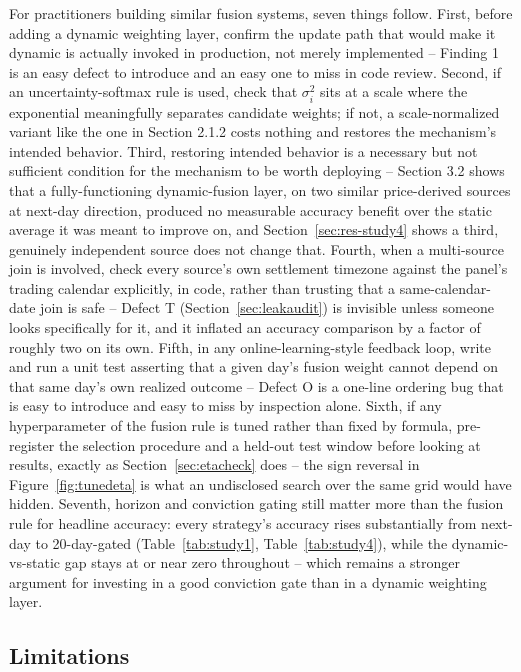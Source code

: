 \documentclass[10pt,a4paper,twocolumn]{article}
\begin{document}
For practitioners building similar fusion systems, seven things follow. First, before adding a dynamic weighting layer, confirm the update path that would make it dynamic is actually invoked in production, not merely implemented -- Finding 1 is an easy defect to introduce and an easy one to miss in code review. Second, if an uncertainty-softmax rule is used, check that $\sigma_i^2$ sits at a scale where the exponential meaningfully separates candidate weights; if not, a scale-normalized variant like the one in Section 2.1.2 costs nothing and restores the mechanism's intended behavior. Third, restoring intended behavior is a necessary but not sufficient condition for the mechanism to be worth deploying -- Section 3.2 shows that a fully-functioning dynamic-fusion layer, on two similar price-derived sources at next-day direction, produced no measurable accuracy benefit over the static average it was meant to improve on, and Section~\ref{sec:res-study4} shows a third, genuinely independent source does not change that. Fourth, when a multi-source join is involved, check every source's own settlement timezone against the panel's trading calendar explicitly, in code, rather than trusting that a same-calendar-date join is safe -- Defect T (Section~\ref{sec:leakaudit}) is invisible unless someone looks specifically for it, and it inflated an accuracy comparison by a factor of roughly two on its own. Fifth, in any online-learning-style feedback loop, write and run a unit test asserting that a given day's fusion weight cannot depend on that same day's own realized outcome -- Defect O is a one-line ordering bug that is easy to introduce and easy to miss by inspection alone. Sixth, if any hyperparameter of the fusion rule is tuned rather than fixed by formula, pre-register the selection procedure and a held-out test window before looking at results, exactly as Section~\ref{sec:etacheck} does -- the sign reversal in Figure~\ref{fig:tunedeta} is what an undisclosed search over the same grid would have hidden. Seventh, horizon and conviction gating still matter more than the fusion rule for headline accuracy: every strategy's accuracy rises substantially from next-day to 20-day-gated (Table~\ref{tab:study1}, Table~\ref{tab:study4}), while the dynamic-vs-static gap stays at or near zero throughout -- which remains a stronger argument for investing in a good conviction gate than in a dynamic weighting layer.

\subsection{Limitations}
\end{document}

